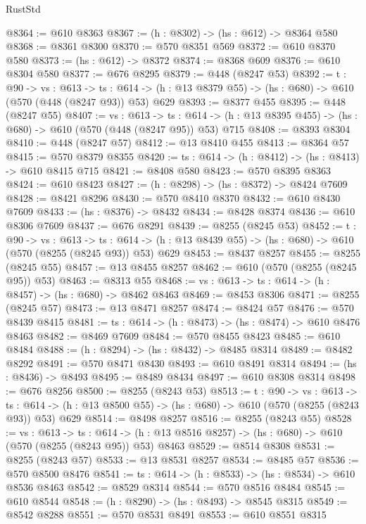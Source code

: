 \begin{lexlean}{RustStd}
\begin{coremodule}
@8364 := @610 @8363
@8367 := (h : @8302) -> (hs : @612) -> @8364 @580
@8368 := @8361 @8300
@8370 := @570 @8351 @569
@8372 := @610 @8370 @580
@8373 := (hs : @612) -> @8372
@8374 := @8368 @609
@8376 := @610 @8304 @580
@8377 := @676 @8295
@8379 := @448 (@8247 @53)
@8392 := {t : @90} ->
  {vs : @613} ->
  {ts : @614} -> (h : @13 @8379 @55) -> (hs : @680) -> @610 (@570 (@448 (@8247 @93)) @53) @629
@8393 := @8377 @455
@8395 := @448 (@8247 @55)
@8407 := {vs : @613} ->
  {ts : @614} -> (h : @13 @8395 @455) -> (hs : @680) -> @610 (@570 (@448 (@8247 @95)) @53) @715
@8408 := @8393 @8304
@8410 := @448 (@8247 @57)
@8412 := @13 @8410 @455
@8413 := @8364 @57
@8415 := @570 @8379 @8355
@8420 := {ts : @614} -> (h : @8412) -> (hs : @8413) -> @610 @8415 @715
@8421 := @8408 @580
@8423 := @570 @8395 @8363
@8424 := @610 @8423
@8427 := (h : @8298) -> (hs : @8372) -> @8424 @7609
@8428 := @8421 @8296
@8430 := @570 @8410 @8370
@8432 := @610 @8430 @7609
@8433 := (hs : @8376) -> @8432
@8434 := @8428 @8374
@8436 := @610 @8306 @7609
@8437 := @676 @8291
@8439 := @8255 (@8245 @53)
@8452 := {t : @90} ->
  {vs : @613} ->
  {ts : @614} -> (h : @13 @8439 @55) -> (hs : @680) -> @610 (@570 (@8255 (@8245 @93)) @53) @629
@8453 := @8437 @8257
@8455 := @8255 (@8245 @55)
@8457 := @13 @8455 @8257
@8462 := @610 (@570 (@8255 (@8245 @95)) @53)
@8463 := @8313 @55
@8468 := {vs : @613} -> {ts : @614} -> (h : @8457) -> (hs : @680) -> @8462 @8463
@8469 := @8453 @8306
@8471 := @8255 (@8245 @57)
@8473 := @13 @8471 @8257
@8474 := @8424 @57
@8476 := @570 @8439 @8415
@8481 := {ts : @614} -> (h : @8473) -> (hs : @8474) -> @610 @8476 @8463
@8482 := @8469 @7609
@8484 := @570 @8455 @8423
@8485 := @610 @8484
@8488 := (h : @8294) -> (hs : @8432) -> @8485 @8314
@8489 := @8482 @8292
@8491 := @570 @8471 @8430
@8493 := @610 @8491 @8314
@8494 := (hs : @8436) -> @8493
@8495 := @8489 @8434
@8497 := @610 @8308 @8314
@8498 := @676 @8256
@8500 := @8255 (@8243 @53)
@8513 := {t : @90} ->
  {vs : @613} ->
  {ts : @614} -> (h : @13 @8500 @55) -> (hs : @680) -> @610 (@570 (@8255 (@8243 @93)) @53) @629
@8514 := @8498 @8257
@8516 := @8255 (@8243 @55)
@8528 := {vs : @613} ->
  {ts : @614} -> (h : @13 @8516 @8257) -> (hs : @680) -> @610 (@570 (@8255 (@8243 @95)) @53) @8463
@8529 := @8514 @8308
@8531 := @8255 (@8243 @57)
@8533 := @13 @8531 @8257
@8534 := @8485 @57
@8536 := @570 @8500 @8476
@8541 := {ts : @614} -> (h : @8533) -> (hs : @8534) -> @610 @8536 @8463
@8542 := @8529 @8314
@8544 := @570 @8516 @8484
@8545 := @610 @8544
@8548 := (h : @8290) -> (hs : @8493) -> @8545 @8315
@8549 := @8542 @8288
@8551 := @570 @8531 @8491
@8553 := @610 @8551 @8315

\end{coremodule}
\end{lexlean}
